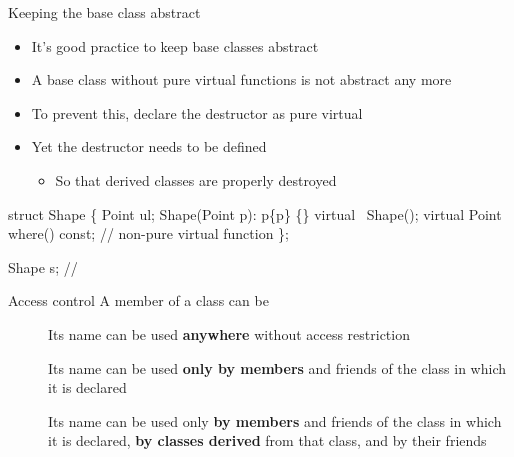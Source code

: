 \begin{frame}[fragile]{Keeping the base class abstract}

  \begin{itemize}
  \item It's good practice to keep base classes abstract
  \item A base class without pure virtual functions is not abstract any more
  \item<2-> To prevent this, declare the destructor as pure virtual
  \item<3-> Yet the destructor needs to be defined
    \begin{itemize}
    \item So that derived classes are properly destroyed
    \end{itemize}
  \end{itemize}

  \begin{codeblock}
struct Shape \{
  Point ul;
  Shape(Point p): p\{p\} \{\}
  virtual ~Shape();
  virtual Point where() const; // non-pure virtual function
\};

Shape s; // 
  \end{codeblock}
\end{frame}

\begin{frame}{Access control}
  A member of a class can be
  \begin{description}
  \item [] Its name can be used \textbf{anywhere} without access
    restriction
  \item [] Its name can be used \textbf{only by members} and friends of the
    class in which it is declared
  \item [] Its name can be used only \textbf{by members} and
    friends of the class in which it is declared, \textbf{by classes derived}
    from that class, and by their friends
  \end{description}
\end{frame}

